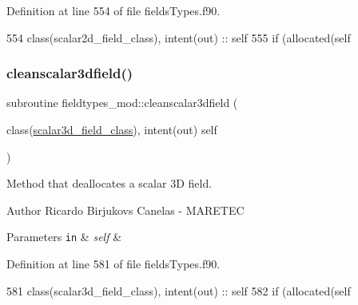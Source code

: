 Definition at line 554 of file fields\+Types.\+f90.


\begin{DoxyCode}
554     \textcolor{keywordtype}{class}(scalar2d\_field\_class), \textcolor{keywordtype}{intent(out)} :: self
555     \textcolor{keywordflow}{if} (\textcolor{keyword}{allocated}(self%
\end{DoxyCode}
\mbox{\label{namespacefieldtypes__mod_a9f3716bcbd2524ed608c86920cab8693}} 
\subsubsection{\texorpdfstring{cleanscalar3dfield()}{cleanscalar3dfield()}}
{\footnotesize\ttfamily subroutine fieldtypes\+\_\+mod\+::cleanscalar3dfield (\begin{DoxyParamCaption}\item[{class(\mbox{\hyperlink{structfieldtypes__mod_1_1scalar3d__field__class}{scalar3d\+\_\+field\+\_\+class}}), intent(out)}]{self }\end{DoxyParamCaption})\hspace{0.3cm}{\ttfamily [private]}}



Method that deallocates a scalar 3D field. 

\begin{DoxyAuthor}{Author}
Ricardo Birjukovs Canelas -\/ M\+A\+R\+E\+T\+EC 
\end{DoxyAuthor}

\begin{DoxyParams}[1]{Parameters}
\mbox{\tt in}  & {\em self} & \\
\hline
\end{DoxyParams}


Definition at line 581 of file fields\+Types.\+f90.


\begin{DoxyCode}
581     \textcolor{keywordtype}{class}(scalar3d\_field\_class), \textcolor{keywordtype}{intent(out)} :: self
582     \textcolor{keywordflow}{if} (\textcolor{keyword}{allocated}(self%
\end{DoxyCode}
\mbox{\label{namespacefieldtypes__mod_aaabae216913c347395d5e19ea2c22286}} 
